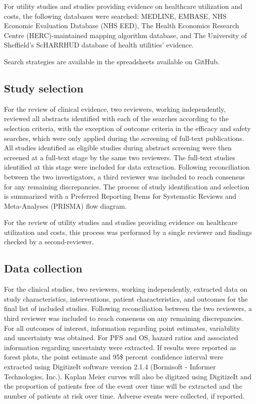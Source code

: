 \documentclass[11pt,final,fleqn]{article}\usepackage[]{graphicx}\usepackage[]{color}
\theoremstyle{plain}
\begin{document}
\begin{appendices}
For utility studies and studies providing evidence on healthcare utilization and costs, the following databases were searched: MEDLINE, EMBASE, NHS Economic Evaluation Database (NHS EED), The Health Economics Research Centre (HERC)-maintained mapping algorithm database, and The University of Sheffield's ScHARRHUD database of health utilities' evidence.

Search strategies are available in the spreadsheets available on GitHub.

\subsection{Study selection}
For the review of clinical evidence, two reviewers, working independently, reviewed all abstracts identified with each of the searches according to the selection criteria, with the exception of outcome criteria in the efficacy and safety searches, which were only applied during the screening of full-text publications. All studies identified as eligible studies during abstract screening were then screened at a full-text stage by the same two reviewers. The full-text studies identified at this stage were included for data extraction. Following reconciliation between the two investigators, a third reviewer was included to reach consensus for any remaining discrepancies. The process of study identification and selection is summarized with a Preferred Reporting Items for Systematic Reviews and Meta-Analyses (PRISMA) flow diagram. 

For the review of utility studies and studies providing evidence on healthcare utilization and costs, this process was performed by a single reviewer and findings checked by a second-reviewer. 

\subsection{Data collection}
For the clinical studies, two reviewers, working independently, extracted data on study characteristics, interventions, patient characteristics, and outcomes for the final list of included studies. Following reconciliation between the two reviewers, a third reviewer was included to reach consensus on any remaining discrepancies. For all outcomes of interest, information regarding point estimates, variability and uncertainty was obtained. For PFS and OS, hazard ratios and associated information regarding uncertainty were extracted. If results were reported as forest plots, the point estimate and 95\$ percent\ confidence interval were extracted using DigitizeIt software version 2.1.4 (Bormisoft - Informer Technologies, Inc.). Kaplan Meier curves will also be digitzed using DigitizeIt and the proportion of patients free of the event over time will be extracted and the number of patients at risk over time. Adverse events were collected, if reported. 


\end{appendices}
\end{document}
